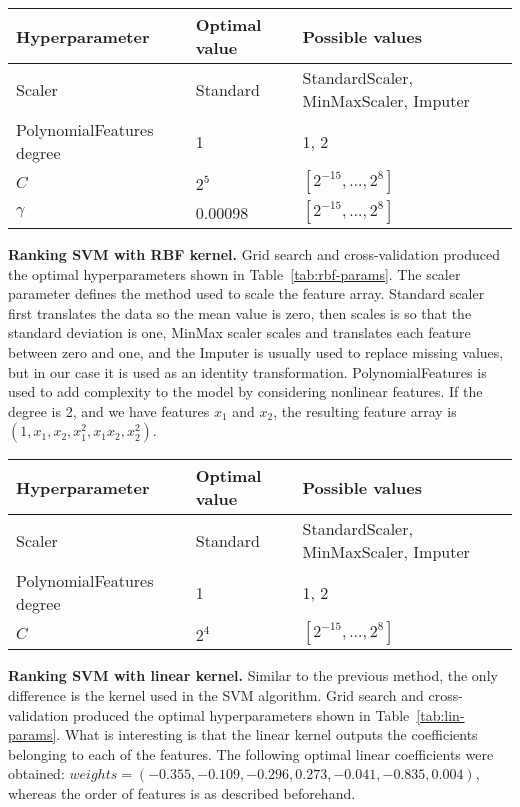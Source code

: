 \documentclass[10pt, a4paper]{article}
\begin{document}
\begin{table*}
\caption{Optimal hyperparameters for Ranking SVM with RBF kernel.}
\label{tab:rbf-params}
\begin{center}
\begin{tabular}{lll}
\toprule
Hyperparameter & Optimal value & Possible values \\
\midrule
Scaler & Standard &  StandardScaler, MinMaxScaler, Imputer \\
PolynomialFeatures degree & 1 & 1, 2  \\
$C$ & $2^5$ & $[2^{-15}, ..., 2^{8}]$ \\
$\gamma$ & 0.00098 & $[2^{-15}, ..., 2^{8}]$ \\
\bottomrule
\end{tabular}
\end{center}
\end{table*}

\textbf{Ranking SVM with RBF kernel.} Grid search and cross-validation produced the optimal hyperparameters shown in Table~\ref{tab:rbf-params}. The scaler parameter defines the method used to scale the feature array. Standard scaler first translates the data so the mean value is zero, then scales is so that the standard deviation is one, MinMax scaler scales and translates each feature between zero and one, and the Imputer is usually used to replace missing values, but in our case it is used as an identity transformation. PolynomialFeatures is used to add complexity to the model by considering nonlinear features. If the degree is 2, and we have features $x_1$ and $x_2$, the resulting feature array is $(1, x_1, x_2, x_1^2, x_1x_2, x_2^2)$.

\begin{table*}
\caption{Optimal hyperparameters for Ranking SVM with linear kernel.}
\label{tab:lin-params}
\begin{center}
\begin{tabular}{lll}
\toprule
Hyperparameter & Optimal value & Possible values \\
\midrule
Scaler & Standard &  StandardScaler, MinMaxScaler, Imputer \\
PolynomialFeatures degree & 1 & 1, 2  \\
$C$ & $2^4$ & $[2^{-15}, ..., 2^{8}]$ \\
\bottomrule
\end{tabular}
\end{center}
\end{table*}

\textbf{Ranking SVM with linear kernel.} Similar to the previous method, the only difference is the kernel used in the SVM algorithm. Grid search and cross-validation produced the optimal hyperparameters shown in Table~\ref{tab:lin-params}. What is interesting is that the linear kernel outputs the coefficients belonging to each of the features. The following optimal linear coefficients were obtained:
$ weights = (-0.355, -0.109, -0.296, 0.273, -0.041, -0.835,  0.004)$, whereas the order of features is as described beforehand.
\end{document}

